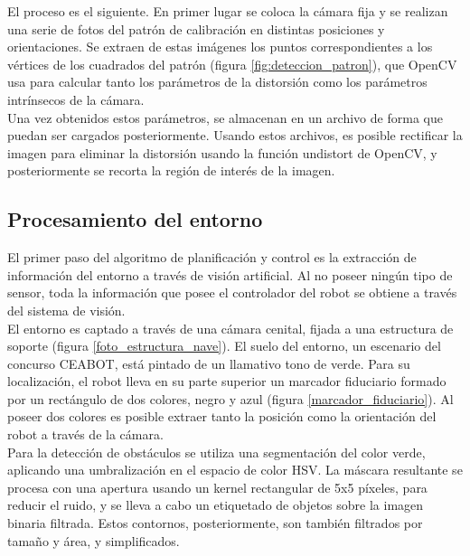 El proceso es el siguiente. En primer lugar se coloca la cámara fija y se realizan una serie de fotos del patrón de calibración en distintas posiciones y orientaciones. Se extraen de estas imágenes los puntos correspondientes a los vértices de los cuadrados del patrón (figura \ref{fig:deteccion_patron}), que OpenCV usa para calcular tanto los parámetros de la distorsión como los parámetros intrínsecos de la cámara.\\

Una vez obtenidos estos parámetros, se almacenan en un archivo de forma que puedan ser cargados posteriormente. Usando estos archivos, es posible rectificar la imagen para eliminar la distorsión usando la función undistort de OpenCV, y posteriormente se recorta la región de interés de la imagen.\\



\subsection{Procesamiento del entorno}
\label{procesamiento}

El primer paso del algoritmo de planificación y control es la extracción de información del entorno a través de visión artificial. Al no poseer ningún tipo de sensor, toda la información que posee el controlador del robot se obtiene a través del sistema de visión.\\

El entorno es captado a través de una cámara cenital, fijada a una estructura de soporte (figura \ref{foto_estructura_nave}). El suelo del entorno, un escenario del concurso CEABOT, está pintado de un llamativo tono de verde. Para su localización, el robot lleva en su parte superior un marcador fiduciario formado por un rectángulo de dos colores, negro y azul (figura \ref{marcador_fiduciario}). Al poseer dos colores es posible extraer tanto la posición como la orientación del robot a través de la cámara.\\

Para la detección de obstáculos se utiliza una segmentación del color verde, aplicando una umbralización en el espacio de color HSV. La máscara resultante se procesa con una apertura usando un kernel rectangular de 5x5 píxeles, para reducir el ruido, y se lleva a cabo un etiquetado de objetos sobre la imagen binaria filtrada. Estos contornos, posteriormente, son también filtrados por tamaño y área, y simplificados.\\

